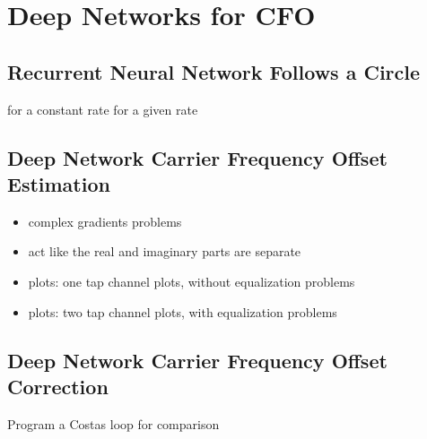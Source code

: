 \chapter{Deep Networks for CFO}

\section{Recurrent Neural Network Follows a Circle}
for a constant rate
for a given rate


\section{Deep Network Carrier Frequency Offset Estimation}
\begin{itemize}
\item complex gradients problems
\item act like the real and imaginary parts are separate
\item plots: one tap channel plots, without equalization problems
\item plots: two tap channel plots, with equalization problems
\end{itemize}

\section{Deep Network Carrier Frequency Offset Correction}
Program a Costas loop for comparison 
